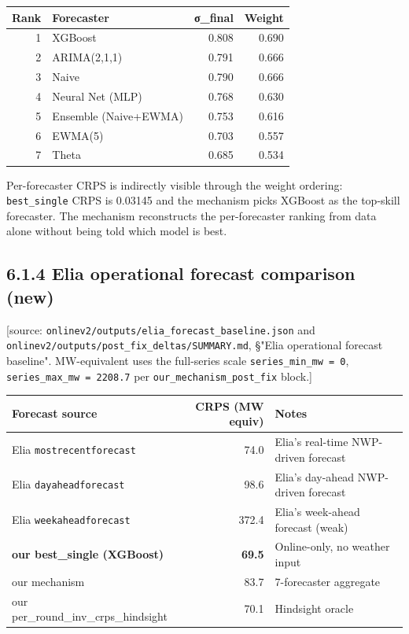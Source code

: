 \documentclass[11pt,a4paper,openany]{report}
\begin{document}
\begin{center}
\small
\begin{tabular}{rlrr}
\toprule
\textbf{Rank} & \textbf{Forecaster} & \textbf{σ\_final} & \textbf{Weight} \\
\midrule
1 & XGBoost & 0.808 & 0.690 \\
2 & ARIMA(2,1,1) & 0.791 & 0.666 \\
3 & Naive & 0.790 & 0.666 \\
4 & Neural Net (MLP) & 0.768 & 0.630 \\
5 & Ensemble (Naive+EWMA) & 0.753 & 0.616 \\
6 & EWMA(5) & 0.703 & 0.557 \\
7 & Theta & 0.685 & 0.534 \\
\bottomrule
\end{tabular}
\end{center}

Per-forecaster CRPS is indirectly visible through the weight ordering:
\texttt{best\_single} CRPS is 0.03145 and the mechanism picks XGBoost as the
top-skill forecaster. The mechanism reconstructs the per-forecaster
ranking from data alone without being told which model is best.

\subsection{6.1.4 Elia operational forecast comparison (new)}

[source: \texttt{onlinev2/outputs/elia\_forecast\_baseline.json} and
\texttt{onlinev2/outputs/post\_fix\_deltas/SUMMARY.md}, §"Elia operational
forecast baseline". MW-equivalent uses the full-series scale
\texttt{series\_min\_mw = 0}, \texttt{series\_max\_mw = 2208.7} per
\texttt{our\_mechanism\_post\_fix} block.]

\begin{center}
\small
\begin{tabular}{lrl}
\toprule
\textbf{Forecast source} & \textbf{CRPS (MW equiv)} & \textbf{Notes} \\
\midrule
Elia \texttt{mostrecentforecast} & 74.0 & Elia's real-time NWP-driven forecast \\
Elia \texttt{dayaheadforecast} & 98.6 & Elia's day-ahead NWP-driven forecast \\
Elia \texttt{weekaheadforecast} & 372.4 & Elia's week-ahead forecast (weak) \\
\textbf{our best_single (XGBoost)} & \textbf{69.5} & Online-only, no weather input \\
our mechanism & 83.7 & 7-forecaster aggregate \\
our per\_round\_inv\_crps\_hindsight & 70.1 & Hindsight oracle \\
\bottomrule
\end{tabular}
\end{center}
\end{document}
